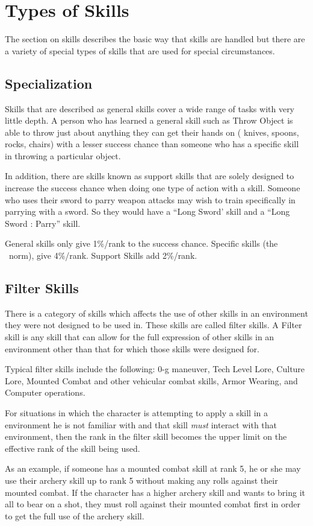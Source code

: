 \section{Types of Skills}

The section on skills describes the basic way that skills are 
handled but there are a variety of special types of skills that are 
used for special circumstances.

\subsection{Specialization}

Skills that are described as general skills cover a wide range of 
tasks with very little depth. A person who has learned a general 
skill such as Throw Object is able to throw just about anything they 
can get their hands on ( knives, spoons, rocks, chairs) with a lesser 
success chance than someone who has a specific skill in throwing a
particular object.

In addition, there are skills known as support skills that are solely 
designed to increase the success chance when doing one type of action 
with a skill. Someone who uses their sword to parry weapon attacks 
may wish to train specifically in parrying with a sword. So they 
would have a ``Long Sword' skill and a ``Long Sword : Parry'' skill.


General skills only give 1\%/rank to the success chance. Specific 
skills (the \SH\ norm), give 4\%/rank. Support Skills add 2\%/rank.

\subsection{Filter Skills}

There is a category of skills which affects the use of other skills 
in an environment they were not designed to be used in. These skills 
are called filter skills. A Filter skill is any skill that can allow 
for the full expression of other skills in an environment other than 
that for which those skills were designed for.

Typical filter skills include the following: 0-g maneuver, Tech 
Level Lore, Culture Lore, Mounted Combat and other vehicular combat 
skills, Armor Wearing, and Computer operations.

For situations in which the character is attempting to apply a skill 
in a environment he is not familiar with and that skill {\em must }
interact with that environment, then the rank in the filter skill 
becomes the upper limit on the effective rank of the skill being 
used.

As an example, if someone has a mounted combat skill at rank 5, he or she
may use their archery skill up to rank 5 without making any rolls
against their mounted combat. If the character has a higher archery skill
and wants to bring it all to bear on a shot, they must roll against
their mounted combat first in order to get the full use of the archery
skill.

